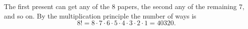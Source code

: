 The first present can get any of the $8$ papers, the second any of the remaining $7$, and so on. By the multiplication principle the number of ways is
\[
8!=8\cdot7\cdot6\cdot5\cdot4\cdot3\cdot2\cdot1=\boxed{40320}.
\]
